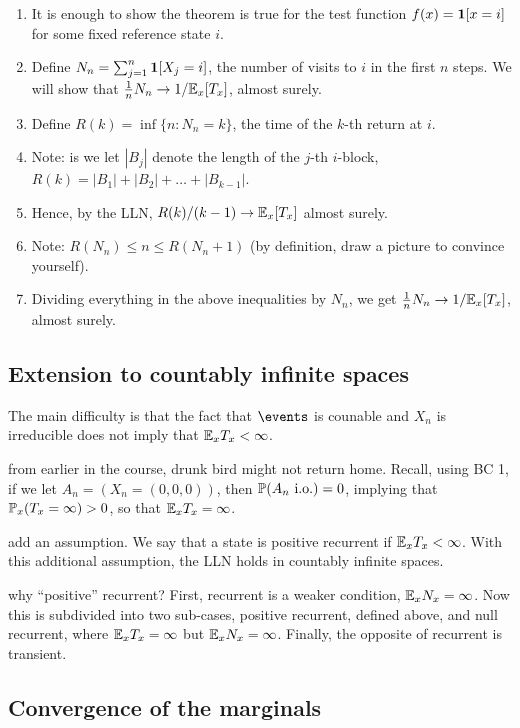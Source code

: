 \documentclass{article}
\begin{document}
\begin{enumerate}
  \item It is enough to show the theorem is true for the test function $f(x) = \1[x = i]$ for some fixed reference state $i$.
  \item Define $N_n = \sum_{j=1}^n \1[X_j = i]$, the number of visits to $i$ in the first $n$ steps. We will show that $\frac{1}{n} N_n \to 1/\E_x [T_x]$, almost surely.
  \item Define $R(k) = \inf\{n:N_n = k\}$, the time of the $k$-th return at $i$.
  \item Note: is we let $|B_j|$ denote the length of the $j$-th $i$-block, $R(k) = |B_1| + |B_2| + \dots + |B_{k-1}|$.
  \item Hence, by the LLN, $R(k) / (k-1) \to \E_x [T_x]$ almost surely.
  \item Note: $R(N_n) \le n \le R(N_n + 1)$ (by definition, draw a picture to convince yourself).
  \item Dividing everything in the above inequalities by $N_n$, we get $\frac{1}{n} N_n \to 1/\E_x [T_x]$, almost surely.
\end{enumerate}


\subsection{Extension to countably infinite spaces}

The main difficulty is that the fact that $\events$ is counable and $X_n$ is irreducible does not imply that $\E_x T_x < \infty$.

 from earlier in the course, drunk bird might not return home. Recall, using BC 1, if we let $A_n = (X_n = (0,0,0))$, then $\P(A_n \io) = 0$, implying that $\P_x(T_x = \infty) > 0$, so that $\E_x T_x = \infty$. 

 add an assumption. We say that a state is positive recurrent if $\E_x T_x < \infty$. With this additional assumption, the LLN holds in countably infinite spaces.

 why ``positive'' recurrent? First, recurrent is a weaker condition, $\E_x N_x = \infty$. Now this is subdivided into two sub-cases, positive recurrent, defined above, and null recurrent, where $\E_x T_x = \infty$ but $\E_x N_x = \infty$. Finally, the opposite of recurrent is transient.


\subsection{Convergence of the marginals}
\end{document}
